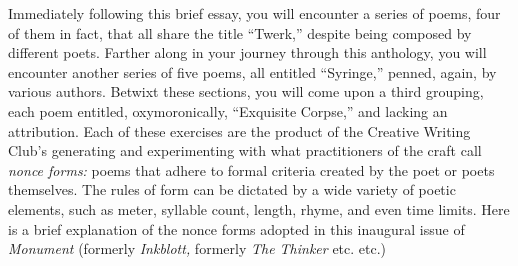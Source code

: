 \clearpage
\pagestyle{footerpage}
\begin{justify}
    \begin{center}
        \centertitle{\Large{\notetitle}}
    \end{center}

    \vspace*{\baselineskip}

    \noindent{}Immediately following this brief essay,
    you will encounter a series of poems,
    four of them in fact, that all share the
    title “Twerk,” despite being composed by
    different poets. Farther along in your
    journey through this anthology, you will
    encounter another series of five poems,
    all entitled “Syringe,” penned, again, by
    various authors. Betwixt these sections,
    you will come upon a third grouping,
    each poem entitled, oxymoronically,
    “Exquisite Corpse,” and lacking an attribution.
    Each of these exercises are the
    product of the Creative Writing Club's
    generating and experimenting with what
    practitioners of the craft call \textit{nonce forms:}
    poems that adhere to formal criteria created
    by the poet or poets themselves. The rules of
    form can be dictated by a wide variety of
    poetic elements, such as meter, syllable
    count, length, rhyme, and even time limits. Here
    is a brief explanation of the nonce forms
    adopted in this inaugural issue of \textit{Monument}
    (formerly \textit{Inkblott,} formerly \textit{The Thinker} etc. etc.)
    
    \begin{center}
    \end{center}
    

\end{justify}
